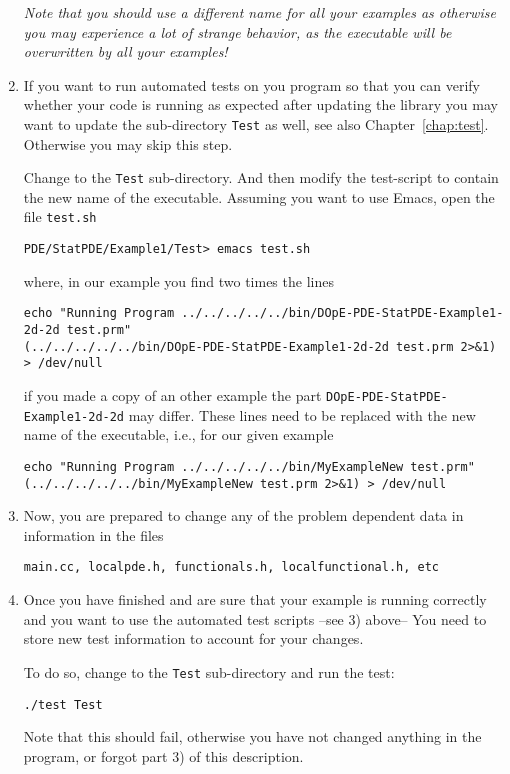 \begin{enumerate}
\textit{Note that you should use a different name for all your 
examples as otherwise you may experience a lot of strange behavior, as
the executable will be overwritten by all your examples!}

\item If you want to run automated tests on you program so that you can 
  verify whether your code is running as expected after updating the 
  library you may want to update the sub-directory \texttt{Test} 
  as well, see also Chapter~\ref{chap:test}. Otherwise you may skip this 
  step.

  Change to the \texttt{Test} sub-directory. And then modify the
  test-script to contain the new name of the executable.
  Assuming you want to use Emacs, open the file \texttt{test.sh}
\begin{verbatim}
PDE/StatPDE/Example1/Test> emacs test.sh
\end{verbatim}
where, in our example you find two times the lines
\begin{verbatim}
echo "Running Program ../../../../../bin/DOpE-PDE-StatPDE-Example1-2d-2d test.prm"
(../../../../../bin/DOpE-PDE-StatPDE-Example1-2d-2d test.prm 2>&1) > /dev/null
\end{verbatim} 
if you made a copy of an other example the part \texttt{DOpE-PDE-StatPDE-Example1-2d-2d}
may differ. These lines need to be replaced with the new name of the 
executable, i.e., for our given example
\begin{verbatim}
echo "Running Program ../../../../../bin/MyExampleNew test.prm"
(../../../../../bin/MyExampleNew test.prm 2>&1) > /dev/null
\end{verbatim} 

\item  Now, you are prepared to change any of the problem
  dependent data in information in the files 
\begin{verbatim}
main.cc, localpde.h, functionals.h, localfunctional.h, etc
\end{verbatim} 

\item Once you have finished and are sure that your example is running correctly
  and you want to use the automated test scripts --see 3) above-- You need 
  to store new test information to account for your changes. 
  
  To do so, change to the \texttt{Test} sub-directory and run the test:
\begin{verbatim}
./test Test
\end{verbatim}
  Note that this should fail, otherwise you have not changed anything in the program, 
  or forgot part 3) of this description.
  

\end{enumerate}
